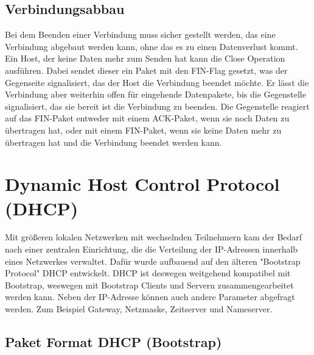 \subsection{Verbindungsabbau}
Bei dem Beenden einer Verbindung muss sicher gestellt werden, das eine Verbindung abgebaut werden kann, ohne das es zu einen Datenverlust kommt. Ein Host, der keine Daten mehr zum Senden hat kann die Close Operation ausführen. Dabei sendet dieser ein Paket mit den FIN-Flag gesetzt, was der Gegenseite signalisiert, das der Host die Verbindung beendet möchte. Er lässt die Verbindung aber weiterhin offen für eingehende Datenpakete, bis die Gegenstelle signalisiert, das sie bereit ist die Verbindung zu beenden. Die Gegenstelle reagiert auf das FIN-Paket entweder mit einem ACK-Paket, wenn sie noch Daten zu übertragen hat, oder mit einem FIN-Paket, wenn sie keine Daten mehr zu übertragen hat und die Verbindung beendet werden kann. 

\section{Dynamic Host Control Protocol (DHCP)}
Mit größeren lokalen Netzwerken mit wechselnden Teilnehmern kam der Bedarf nach einer zentralen Einrichtung, die die Verteilung der IP-Adressen innerhalb eines Netzwerkes verwaltet. Dafür wurde aufbauend auf den älteren {}"Bootstrap Protocol{}" DHCP entwickelt. DHCP ist deswegen weitgehend kompatibel mit Bootstrap, weswegen mit Bootstrap Clients und Servern zusammengearbeitet werden kann. 
Neben der IP-Adresse können auch andere Parameter abgefragt werden. Zum Beispiel Gateway, Netzmaske, Zeitserver und Nameserver. 



\subsection{Paket Format DHCP (Bootstrap)}

